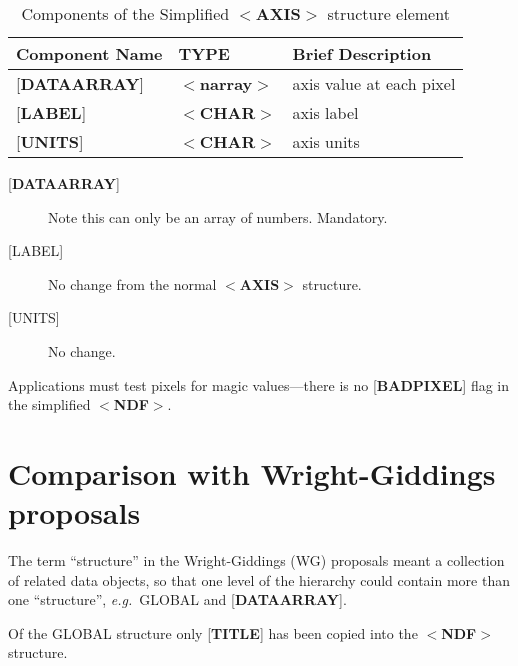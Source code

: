 \documentclass[twoside,11pt]{article}
\newcommand{\xlabel}[1]{}
\renewcommand{\_}{\texttt{\symbol{95}}}
\begin{document}
\begin{table}[htb]
\centering
\caption{Components of the Simplified $<${\bf AXIS}$>$ structure element}
\begin{tabular}{|l|l|l|}
\hline
Component Name & TYPE & Brief Description \\ \hline
{[}{\bf DATA\_ARRAY}{]} & $<${\bf narray}$>$ & axis value at each pixel \\
{[}{\bf LABEL}{]} & $<${\bf \_CHAR}$>$ & axis label \\
{[}{\bf UNITS}{]} & $<${\bf \_CHAR}$>$ & axis units \\ \hline
\end{tabular}
\end{table}

\begin{description}
\item [{[}{\bf DATA\_ARRAY}{]}]  Note this can only be an array of numbers. 
Mandatory.
\item [{[}LABEL{]}]  No change from the normal $<${\bf AXIS}$>$ structure.
\item [{[}UNITS{]}]  No change.
\end{description}
Applications must test pixels for magic values---there is no
{[}{\bf BAD\_PIXEL}{]} flag in the simplified $<${\bf NDF}$>$.

\xlabel{se_comparison}\section{Comparison with Wright-Giddings proposals\label{se:comparison}}

The term ``structure'' in the Wright-Giddings (WG) proposals meant
a collection of related data objects, so that one level of the hierarchy
could contain more than one ``structure'', {\it e.g.}\  GLOBAL and
{[}{\bf DATA\_ARRAY}{]}. 

Of the GLOBAL structure only {[}{\bf TITLE}{]} has been copied into the
$<${\bf NDF}$>$ structure.
\end{document}
